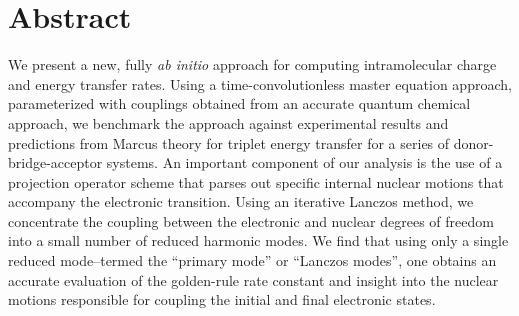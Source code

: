 \begingroup
\let\clearpage\relax
\let\cleardoublepage\relax
\let\cleardoublepage\relax
\chapter*{Abstract}
We present a new, fully {\em ab initio} approach for computing intramolecular charge and
energy transfer rates.  Using a time-convolutionless master equation approach, parameterized
with couplings obtained from an accurate quantum chemical approach, we  benchmark the approach
against  experimental results and predictions from Marcus theory for triplet energy transfer for a
series of donor-bridge-acceptor systems.
An important component of our analysis is the use of a projection operator scheme
that parses out specific internal nuclear motions that accompany
the electronic transition.
Using an iterative Lanczos method, we  concentrate the coupling between the electronic and nuclear
degrees of freedom into a small number of reduced harmonic modes.
We find that  using only a single reduced mode--termed the ``primary mode'' or ``Lanczos modes'',
 one obtains an accurate evaluation of the golden-rule rate constant and
insight into the nuclear motions responsible for coupling the initial and final electronic states.

